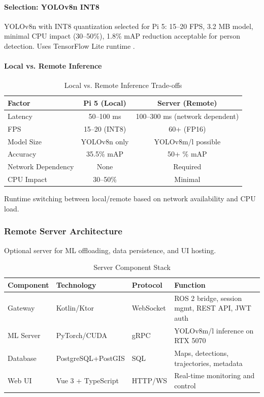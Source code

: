 \paragraph{Selection: YOLOv8n INT8}

YOLOv8n with INT8 quantization selected for Pi 5: 15--20 FPS, 3.2 MB model, minimal CPU impact (30--50\%), 1.8\% mAP reduction acceptable for person detection. Uses TensorFlow Lite runtime \parencite{tflite_quantization}.

\paragraph{Local vs. Remote Inference}

\begin{table}[H]
\centering
\caption{Local vs. Remote Inference Trade-offs}
\label{tab:inference-location}
\begin{tabular}{@{}lcc@{}}
\toprule
\textbf{Factor} & \textbf{Pi 5 (Local)} & \textbf{Server (Remote)} \\
\midrule
Latency & 50--100 ms & 100--300 ms (network dependent) \\
FPS & 15--20 (INT8) & 60+ (FP16) \\
Model Size & YOLOv8n only & YOLOv8m/l possible \\
Accuracy & 35.5\% mAP & 50+ \% mAP \\
Network Dependency & None & Required \\
CPU Impact & 30--50\% & Minimal \\
\bottomrule
\end{tabular}
\end{table}

Runtime switching between local/remote based on network availability and CPU load.

\subsubsection{Remote Server Architecture}

Optional server for ML offloading, data persistence, and UI hosting.

\begin{table}[H]
\centering
\caption{Server Component Stack}
\begin{tabular}{@{}lllp{5cm}@{}}
\toprule
\textbf{Component} & \textbf{Technology} & \textbf{Protocol} & \textbf{Function} \\
\midrule
Gateway & Kotlin/Ktor & WebSocket & ROS 2 bridge, session mgmt, REST API, JWT auth \\
ML Server & PyTorch/CUDA & gRPC & YOLOv8m/l inference on RTX 5070 \\
Database & PostgreSQL+PostGIS & SQL & Maps, detections, trajectories, metadata \\
Web UI & Vue 3 + TypeScript & HTTP/WS & Real-time monitoring and control \\
\bottomrule
\end{tabular}
\end{table}

